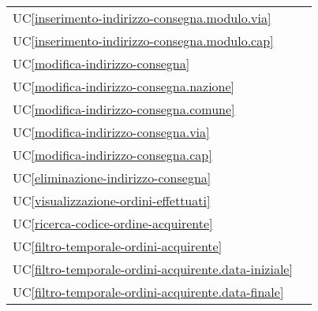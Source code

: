\begin{longtable}{C{6cm} C{6cm}}
	UC\ref{inserimento-indirizzo-consegna.modulo.via} &  \\

    UC\ref{inserimento-indirizzo-consegna.modulo.cap} &  \\

	UC\ref{modifica-indirizzo-consegna} &  \\

    UC\ref{modifica-indirizzo-consegna.nazione} &  \\

	UC\ref{modifica-indirizzo-consegna.comune} &  \\

    UC\ref{modifica-indirizzo-consegna.via} &  \\

	UC\ref{modifica-indirizzo-consegna.cap} &  \\

    UC\ref{eliminazione-indirizzo-consegna} &  \\

	UC\ref{visualizzazione-ordini-effettuati} &  \newline {} \\

	UC\ref{ricerca-codice-ordine-acquirente} &  \\

    UC\ref{filtro-temporale-ordini-acquirente} &  \\

	UC\ref{filtro-temporale-ordini-acquirente.data-iniziale} &  \\

    UC\ref{filtro-temporale-ordini-acquirente.data-finale} &  \\


\end{longtable}
